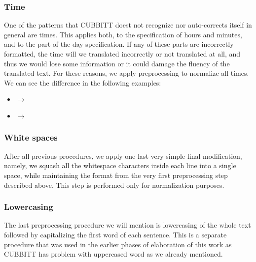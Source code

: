 \subsubsection*{Time}
One of the patterns that CUBBITT doest not recognize nor auto-corrects itself in general are times. This applies both, to the specification of hours and minutes, and to the  part of the day specification. If any of these parts are incorrectly formatted, the time will we translated incorrectly or not translated at all, and thus we would lose some information or it could damage the fluency of the translated text. For these reasons, we apply preprocessing to normalize all times. We can see the difference in the following examples:
\begin{itemize}
	\item {} $\rightarrow$ 
	\item {} $\rightarrow$ 
\end{itemize}

\subsubsection*{White spaces}
After all previous procedures, we apply one last very simple final modification, namely, we squash all the whitespace characters inside each line into a single space, while maintaining the format from the very first preprocessing step described above. This step is performed only for normalization purposes.

\subsubsection*{Lowercasing}
The last preprocessing procedure we will mention is lowercasing of the whole text followed by capitalizing the first word of each sentence. This is a separate procedure that was used in the earlier phases of elaboration of this work as CUBBITT has problem with uppercased word as we already mentioned.















